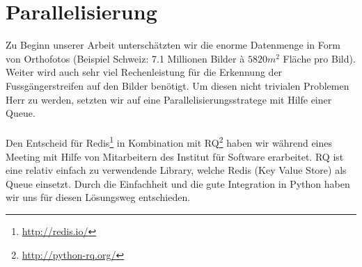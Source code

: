 \section{Parallelisierung}
Zu Beginn unserer Arbeit unterschätzten wir die enorme Datenmenge in Form von Orthofotos (Beispiel Schweiz: 7.1 Millionen Bilder à $5820 m^{2}$ Fläche pro Bild). Weiter wird auch sehr viel Rechenleistung für die Erkennung der Fussgängerstreifen auf den Bilder benötigt. Um diesen nicht trivialen Problemen Herr zu werden, setzten wir auf eine Parallelisierungsstratege mit Hilfe einer Queue. \\ \\

Den Entscheid für Redis\footnote{\url{http://redis.io/}} in Kombination mit RQ\footnote{\url{http://python-rq.org/}} haben wir während eines Meeting mit Hilfe von Mitarbeitern des Institut für Software erarbeitet. RQ ist eine relativ einfach zu verwendende Library, welche Redis (Key Value Store) als Queue einsetzt. Durch die Einfachheit und die gute Integration in Python haben wir uns für diesen Lösungsweg entschieden.

\newpage
